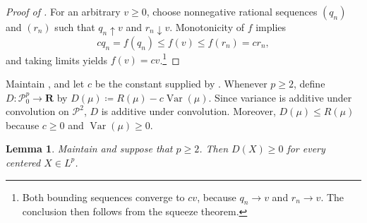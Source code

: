 \documentclass[11pt]{amsart}
\theoremstyle{plain}
\newtheorem{lemma}{Lemma}
\theoremstyle{definition}
\theoremstyle{remark}
\numberwithin{equation}{section}
\newcommand{\1}{\mathbf 1}
\begin{document}
\begin{proof}[Proof of ]
For an arbitrary \(v\geq0\), choose nonnegative rational sequences \((q_n)\) and \((r_n)\) such that \(q_n\uparrow v\) and \(r_n\downarrow v\). Monotonicity of \(f\) implies  
\[cq_n=f(q_n)\leq f(v)\leq f(r_n)=cr_n,\]
and taking limits yields \(f(v)=cv\).\footnote{Both bounding sequences converge to \(cv\), because \(q_n\to v\) and \(r_n\to v\). The conclusion then follows from the squeeze theorem.}
\end{proof}

Maintain , and let \(c\) be the constant supplied by . Whenever \(p\geq2\), define \(D\colon\mathcal P_0^p\to\mathbf R\) by \(D(\mu)\coloneqq R(\mu)-c\operatorname{Var}(\mu)\). Since variance is additive under convolution on \(\mathcal P^2\), \(D\) is additive under convolution. Moreover, \(D(\mu)\leq R(\mu)\) because \(c\geq0\) and \(\operatorname{Var}(\mu)\geq0\).

\begin{lemma}\label{lem:residual-nonnegative}
Maintain  and suppose that \(p\geq2\). Then \(D(X)\geq0\) for every centered \(X\in L^p\).
\end{lemma}
\end{document}
